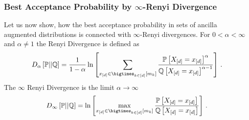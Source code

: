 \subsubsection{Best Acceptance Probability by $\infty$-Renyi Divergence}

Let us now show, how the best acceptance probability in sets of ancilla augmented distributions is connected with $\infty$-Renyi divergences.
For $0<\alpha<\infty$ and $\alpha\neq 1$ the Renyi Divergence is defined as
\begin{align*}
    D_{\alpha}\left[\probtensor||\mathbb{Q}\right]
    = \frac{1}{1-\alpha} \lnof{\sum_{\shortcatindicesin}
        \frac{\probat{\indexedshortcatvariables}^{\alpha}}{\mathbb{Q}\left[\indexedshortcatvariables\right]^{\alpha-1}}
    } \, .
\end{align*}
The $\infty$ Renyi Divergence is the limit $\alpha\rightarrow\infty$
\begin{align*}
    D_{\infty}\left[\probtensor||\mathbb{Q}\right]
    = \lnof{\max_{\shortcatindicesin}
        \frac{\probat{\indexedshortcatvariables}}{\mathbb{Q}\left[\indexedshortcatvariables\right]}
    } \, .
\end{align*}

